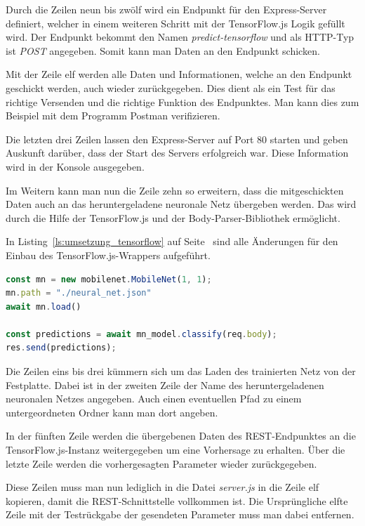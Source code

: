Durch die Zeilen neun bis zwölf wird ein Endpunkt für den Express-Server definiert, welcher in einem weiteren Schritt
mit der TensorFlow.js Logik gefüllt wird. Der Endpunkt bekommt den Namen \textit{predict-tensorflow} und als HTTP-Typ
ist \textit{POST} angegeben. Somit kann man Daten an den Endpunkt schicken.

Mit der Zeile elf werden alle Daten und Informationen, welche an den Endpunkt geschickt werden, auch wieder
zurückgegeben. Dies dient als ein Test für das richtige Versenden und die richtige Funktion des Endpunktes. Man kann
dies zum Beispiel mit dem Programm Postman verifizieren.

Die letzten drei Zeilen lassen den Express-Server auf Port 80 starten und geben Auskunft darüber, dass der Start des
Servers erfolgreich war. Diese Information wird in der Konsole ausgegeben.

Im Weitern kann man nun die Zeile zehn so erweitern, dass die mitgeschickten Daten auch an das heruntergeladene
neuronale Netz übergeben werden. Das wird durch die Hilfe der TensorFlow.js und der Body-Parser-Bibliothek ermöglicht.

In Listing~\ref{ls:umsetzung_tensorflow} auf Seite~\pageref{ls:umsetzung_tensorflow} sind alle Änderungen für den Einbau
des TensorFlow.js-Wrappers aufgeführt.

\begin{lstlisting}[language=JavaScript, caption=Der TensorFlow.js Programmteil, label=ls:umsetzung_tensorflow]
const mn = new mobilenet.MobileNet(1, 1);
mn.path = "./neural_net.json"
await mn.load()

const predictions = await mn_model.classify(req.body);
res.send(predictions);
\end{lstlisting}

Die Zeilen eins bis drei kümmern sich um das Laden des trainierten Netz von der Festplatte. Dabei ist in der zweiten
Zeile der Name des heruntergeladenen neuronalen Netzes angegeben. Auch einen eventuellen Pfad zu einem untergeordneten
Ordner kann man dort angeben.

In der fünften Zeile werden die übergebenen Daten des REST-Endpunktes an die TensorFlow.js-Instanz weitergegeben um eine
Vorhersage zu erhalten. Über die letzte Zeile werden die vorhergesagten Parameter wieder zurückgegeben.

Diese Zeilen muss man nun lediglich in die Datei \textit{server.js} in die Zeile elf kopieren, damit die
REST-Schnittstelle vollkommen ist. Die Ursprüngliche elfte Zeile mit der Testrückgabe der gesendeten Parameter muss man
dabei entfernen.

